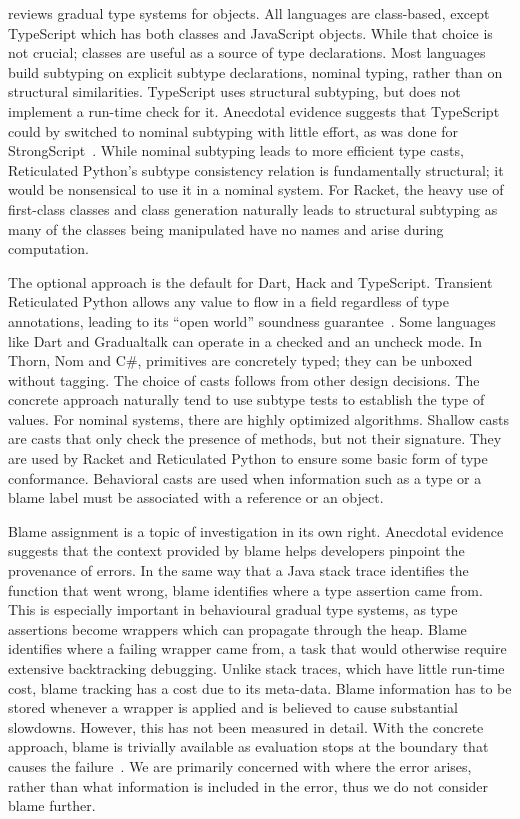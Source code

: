 \documentclass[USenglish]{tex/lipics-v2016}
\begin{document}
 reviews gradual type systems for objects.  All languages are
class-based, except TypeScript which has both classes and JavaScript
objects. While that choice is not crucial; classes are useful as a source of
type declarations.  Most languages build subtyping on explicit subtype
declarations, nominal typing, rather than on structural similarities.
TypeScript uses structural subtyping, but does not implement a run-time
check for it. Anecdotal evidence suggests that TypeScript could by switched
to nominal subtyping with little effort, as was done for
StrongScript~\cite{ecoop15}.  While nominal subtyping leads to more
efficient type casts, Reticulated Python's subtype consistency relation is
fundamentally structural; it would be nonsensical to use it in a nominal
system. For Racket, the heavy use of first-class classes and class
generation naturally leads to structural subtyping as many of the classes
being manipulated have no names and arise during computation.

The optional approach is the default for Dart, Hack and TypeScript.
Transient Reticulated Python allows any value to flow in a field regardless
of type annotations, leading to its ``open world'' soundness
guarantee~\cite{siek14}.  Some languages like Dart and Gradualtalk can
operate in a checked and an uncheck mode.  In Thorn, Nom and C\#, primitives
are concretely typed; they can be unboxed without tagging.  The choice of
casts follows from other design decisions. The concrete approach naturally
tend to use subtype tests to establish the type of values. For nominal
systems, there are highly optimized algorithms. Shallow casts are casts that
only check the presence of methods, but not their signature. They are used
by Racket and Reticulated Python to ensure some basic form of type
conformance.  Behavioral casts are used when information such as a type or a
blame label must be associated with a reference or an object.

Blame assignment is a topic of investigation in its own right. Anecdotal
evidence suggests that the context provided by blame helps developers
pinpoint the provenance of errors. In the same way that a Java stack trace
identifies the function that went wrong, blame identifies where a type
assertion came from. This is especially important in behavioural gradual
type systems, as type assertions become wrappers which can propagate through
the heap. Blame identifies where a failing wrapper came from, a task that
would otherwise require extensive backtracking debugging. Unlike stack
traces, which have little run-time cost, blame tracking has a cost due to
its meta-data. Blame information has to be stored whenever a wrapper is
applied and is believed to cause substantial slowdowns. However, this has
not been measured in detail. With the concrete approach, blame is trivially
available as evaluation stops at the boundary that causes the
failure~\cite{Muehlboeck2017}.  We are primarily concerned with where the
error arises, rather than what information is included in the error, thus we
do not consider blame further.
\end{document}
